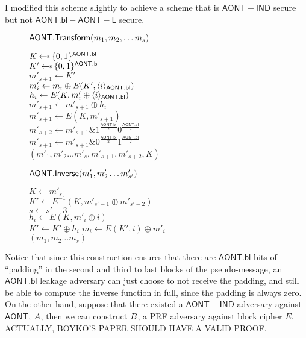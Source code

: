 \documentclass[11pt,twoside]{article}
\begin{document}
I modified this scheme slightly to achieve a scheme that is $\mathsf{AONT-IND}$ secure but not $\mathsf{AONT.bl-AONT-L}$ secure. 

\begin{figure}[H]
{
\underline{$\mathsf{AONT.Transform}(m_1,m_2,\dots m_s)$}

\begin{algorithm}[H]
$K\getsr \bits^\schemefont{AONT.bl}$\\
$K'\getsr \bits^\schemefont{AONT.bl}$\\
$m'_{s+1}\gets K'$\\
{
$m'_i\gets m_i \oplus E(K',\langle i \rangle_{\mathsf{AONT.bl}})$\\
$h_i\gets E(K,m'_i\oplus \langle i \rangle_{\mathsf{AONT.bl}})$\\
$m'_{s+1}\gets m'_{s+1}\oplus h_i$\\
}
$m'_{s+1}\gets E(K,m'_{s+1})$\\
$m'_{s+2}\gets m'_{s+1} \mathrel{\&} 1^{\frac{\mathsf{AONT.bl}}{2}}0^{\frac{\mathsf{AONT.bl}}{2}}$\\
$m'_{s+1}\gets m'_{s+1} \mathrel{\&} 0^{\frac{\mathsf{AONT.bl}}{2}}1^{\frac{\mathsf{AONT.bl}}{2}}$\\
\Return $(m'_1,m'_2\dots m'_s, m'_{s+1}, m'_{s+2}, K)$
\end{algorithm}
}
{
\underline{$\mathsf{AONT.Inverse}(m'_1,m'_2\dots m'_{s'})$}

\begin{algorithm}[H]
$K\gets m'_{s'}$\\
$K'\gets E^{-1}(K,m'_{s'-1} \oplus m'_{s'-2})$\\
$s\gets s'-3$\\
{
$h_i\gets E(K,m'_i\oplus i)$\\
$K'\gets K'\oplus h_i$
}
{
$m_i\gets E(K',i)\oplus m'_i$\\
}
\Return $(m_1,m_2\dots m_{s})$
\end{algorithm}
}
\end{figure} 

Notice that since this construction ensures that there are $\mathsf{AONT.bl}$ bits of ``padding'' in the second and third to last blocks of the pseudo-message, an $\mathsf{AONT.bl}$ leakage adversary can just choose to not receive the padding, and still be able to compute the inverse function in full, since the padding is always zero. On the other hand, suppose that there existed a $\mathsf{AONT-IND}$ adversary against $\mathsf{AONT}$, $A$, then we can construct $B$, a PRF adversary against block cipher $E$. ACTUALLY, BOYKO'S PAPER SHOULD HAVE A VALID PROOF. 
\end{document}
